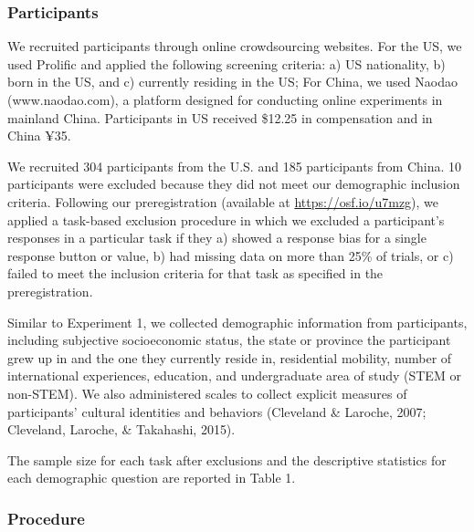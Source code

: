 \documentclass[
  man,floatsintext]{apa6}
\begin{document}
\hypertarget{participants-1}{%
\subsubsection{Participants}\label{participants-1}}

We recruited participants through online crowdsourcing websites. For the US, we used Prolific and applied the following screening criteria: a) US nationality, b) born in the US, and c) currently residing in the US; For China, we used Naodao (www.naodao.com), a platform designed for conducting online experiments in mainland China. Participants in US received \$12.25 in compensation and in China ¥35.

We recruited 304 participants from the U.S. and 185 participants from China. 10 participants were excluded because they did not meet our demographic inclusion criteria. Following our preregistration (available at \url{https://osf.io/u7mzg}), we applied a task-based exclusion procedure in which we excluded a participant's responses in a particular task if they a) showed a response bias for a single response button or value, b) had missing data on more than 25\% of trials, or c) failed to meet the inclusion criteria for that task as specified in the preregistration.

Similar to Experiment 1, we collected demographic information from participants, including subjective socioeconomic status, the state or province the participant grew up in and the one they currently reside in, residential mobility, number of international experiences, education, and undergraduate area of study (STEM or non-STEM). We also administered scales to collect explicit measures of participants' cultural identities and behaviors (Cleveland \& Laroche, 2007; Cleveland, Laroche, \& Takahashi, 2015).

The sample size for each task after exclusions and the descriptive statistics for each demographic question are reported in Table 1.

\hypertarget{procedure-1}{%
\subsubsection{Procedure}\label{procedure-1}}
\end{document}
